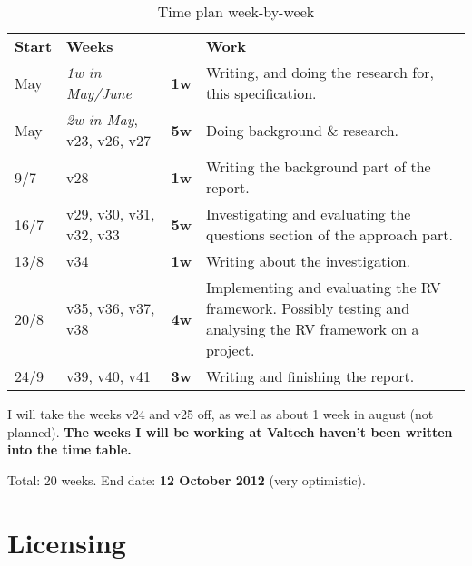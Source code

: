 \documentclass[a4paper,11pt]{article}
\begin{document}
\begin{center}
	\renewcommand{\arraystretch}{1.5}
	\begin{table}[h!b!p!]
	
	\begin{tabular}{ l | l l | p{8cm} }
		
		\textbf{Start} & \textbf{Weeks} &  & \textbf{Work} \\
		\noalign{\smallskip}\hline\noalign{\smallskip}
		
		May & \textit{1w in May/June} & \textbf{1w} &
		Writing, and doing the research for, this specification.
		\\
		
		May & \textit{2w in May}, v23\footnotemark[1], v26, v27 & \textbf{5w} &
		Doing background \& research.
		\\
		
		9/7 & v28 & \textbf{1w} &
		Writing the background part of the report.
		\\
		
		16/7 & v29, v30, v31, v32, v33 & \textbf{5w} &
		Investigating and evaluating the questions section of the approach part.
		\\
		
		13/8 & v34& \textbf{1w} &
		Writing about the investigation.
		\\
		
		20/8 & v35, v36, v37, v38 & \textbf{4w} &
		Implementing and evaluating the RV framework.
		Possibly testing and analysing the RV framework on a project.
		\\
		
		24/9 & v39, v40, v41 & \textbf{3w} &
		Writing and finishing the report.
		\\
		
	\end{tabular}
	\caption{Time plan week-by-week}
	\end{table}
\end{center}


I will take the weeks v24 and v25 off, as well as about 1 week in august (not planned).
\textbf{The weeks I will be working at Valtech haven't been written into the time table.}

Total: 20 weeks. End date: \textbf{12 October 2012} (very optimistic).

\section{Licensing}
\end{document}

